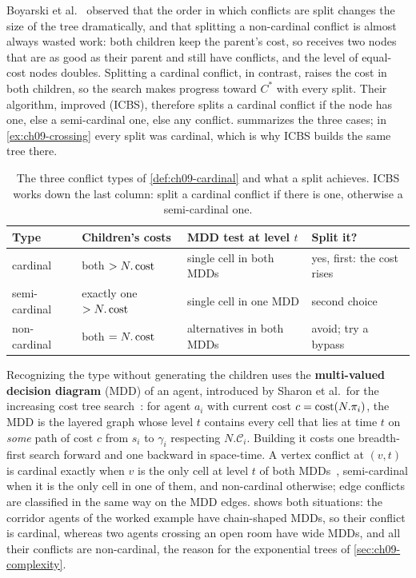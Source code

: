 Boyarski et al.~\cite{boyarski2015icbs} observed that the order in which
conflicts are split changes the size of the tree dramatically, and that
splitting a non-cardinal conflict is almost always wasted work: both
children keep the parent's cost, so \Open receives two nodes that are as
good as their parent and still have conflicts, and the level of equal-cost
nodes doubles. Splitting a cardinal conflict, in contrast, raises the cost in
both children, so the search makes progress toward $C^*$ with every split.
Their algorithm, improved \cbs (ICBS),
therefore splits a cardinal conflict if the node has
one, else a semi-cardinal one, else any conflict. 
summarizes the three cases; in \cref{ex:ch09-crossing} every split was
cardinal, which is why ICBS builds the same tree there.

\begin{table}[tb]
  \centering\small
  \caption{The three conflict types of \cref{def:ch09-cardinal} and what a
  split achieves. ICBS works down the last column: split a cardinal conflict
  if there is one, otherwise a semi-cardinal one.}
  \label{tab:ch09-conflict-types}
  \begin{tabular}{@{}llll@{}}
  \toprule
  Type & Children's costs & MDD test at level $t$ & Split it? \\
  \midrule
  cardinal & both $> N.\operatorname{cost}$ & single cell in both MDDs & yes, first: the cost rises\\
  semi-cardinal & exactly one $> N.\operatorname{cost}$ & single cell in one MDD & second choice\\
  non-cardinal & both $= N.\operatorname{cost}$ & alternatives in both MDDs & avoid; try a bypass\\
  \bottomrule
  \end{tabular}
\end{table}

Recognizing the type without generating the children uses the
\textbf{multi-valued decision diagram} (MDD) of an agent,
introduced by Sharon et al.\ for the increasing cost tree
search~\cite{sharon2013icts}: for agent $a_i$ with current cost $c =
\operatorname{cost}(N.\pi_i)$, the MDD is the layered graph whose level $t$ contains every
cell that lies at time $t$ on \emph{some} path of cost $c$ from $s_i$ to
$\gamma_i$ respecting $N.\mathcal{C}_i$. Building it costs one breadth-first
search forward and one backward in space-time. A vertex conflict at
$(v, t)$ is cardinal exactly when $v$ is the only cell at level $t$ of both
MDDs~\cite{boyarski2015icbs}, semi-cardinal when it is the only cell in one of them, and
non-cardinal otherwise; edge conflicts are classified in the same way on
the MDD edges.  shows both situations: the corridor
agents of the worked example have chain-shaped MDDs, so their conflict is
cardinal, whereas two agents crossing an open room have wide MDDs, and all
their conflicts are non-cardinal, the reason for the exponential trees of
\cref{sec:ch09-complexity}.


